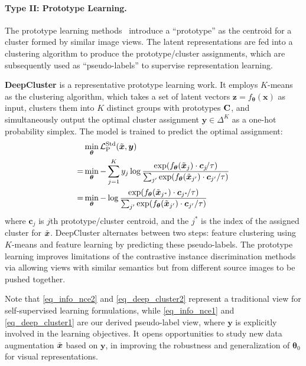 \documentclass[10pt,twocolumn,letterpaper]{article}
\newcommand{\Cmat}{{\bf C}}
\newcommand{\cv}[0]{{\boldsymbol{c}}}
\newcommand{\xv}{\boldsymbol{x}}
\newcommand{\yv}{\boldsymbol{y}}
\newcommand{\zv}{\boldsymbol{z}}
\newcommand{\thetav}{\boldsymbol{\theta}}
\newcommand{\Lcal}{\mathcal{L}}
\begin{document}
\paragraph{Type II: Prototype Learning.}
The prototype learning methods~\cite{caron2018deepcluster,li2020prototypical,caron2020unsupervised} introduce a ``prototype'' as the centroid for a cluster formed by similar image views. 
The latent representations are fed into a clustering algorithm to produce the prototype/cluster assignments, which are subsequently used as ``pseudo-labels'' to supervise representation learning. 

{\bf  DeepCluster} is a representative prototype learning work. It employs $K$-means as the clustering algorithm, which takes a set of latent vectors $\zv = f_{\thetav} (\xv)$ as input, clusters them into $K$ distinct groups with prototypes $\Cmat$,  and simultaneously output the optimal cluster assignment $ \yv  \in \Delta^K$ as a one-hot probability simplex. The model is trained to predict the optimal assignment:
\begin{align} 
\hspace{-0mm}
& \min_{\thetav} \Lcal^{\text{Std}}_{\text{P}} ( \Tilde{\xv}, \yv) \nonumber\\
=& \min_{\thetav} - \sum_{j=1}^K y_{j} \log \frac{\exp(f_{\thetav} (\Tilde{\xv}_j)  \cdot \cv_{j} \! /\tau)}{ \sum_{j'}\exp(f_{\thetav} (\Tilde{\xv}_{j'}) \cdot \cv_{j'} /\tau)  }  
\label{eq_deep_cluster1} \\
=& \min_{\thetav}  -\log \frac{\exp(f_{\thetav} (\Tilde{\xv}_{j^*})  \cdot \cv_{j^*} \! /\tau)}{ \sum_{j'}\exp(f_{\thetav} (\Tilde{\xv}_{j'})  \cdot \cv_{j'} /\tau) }  
\label{eq_deep_cluster2}
\end{align}
where $\cv_j$ is $j$th prototype/cluster centroid, and the $j^*$ is the index of the assigned cluster for $\Tilde{\xv}$. DeepCluster alternates between two steps: feature clustering using $K$-means and feature learning by predicting these pseudo-labels.
The prototype learning improves limitations of the contrastive instance discrimination methods via allowing views with similar semantics but from different source images to be pushed together.

Note that \eqref{eq_info_nce2} and \eqref{eq_deep_cluster2} represent a traditional view for self-supervised learning formulations, while \eqref{eq_info_nce1} and \eqref{eq_deep_cluster1} are our derived pseudo-label view, where $\yv$ is explicitly involved in the learning objectives. It opens opportunities to study new data augmentation $\Tilde{\xv}$ based on $\yv$, in improving the robustness and generalization of $\thetav_0$ for visual representations. 
\end{document}
